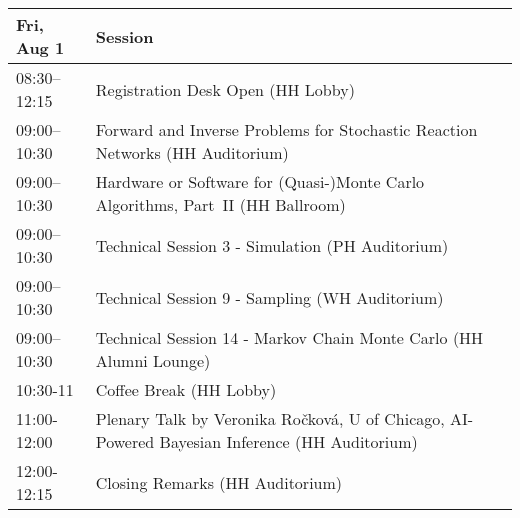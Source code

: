 \begin{table}
{\footnotesize
\begin{tabularx}{\textwidth}{>{\hsize=0.32\hsize}X|>{\hsize=1.7\hsize}X}
\hline
\textbf{Fri, Aug 1} & \textbf{Session} \\
\hline
\cellcolor{\EmptyColor}08:30–12:15 & \cellcolor{\EmptyColor}Registration Desk Open (HH Lobby) \\
\cellcolor{\SessionTitleColor}09:00–10:30 & \cellcolor{\SessionTitleColor}Forward and Inverse Problems for Stochastic Reaction Networks (HH Auditorium) \\
\cellcolor{\SessionTitleColor}09:00–10:30 & \cellcolor{\SessionTitleColor}Hardware or Software for (Quasi-)Monte Carlo Algorithms, Part~II (HH Ballroom) \\
\cellcolor{\SessionLightColor}09:00–10:30 & \cellcolor{\SessionLightColor}Technical Session 3 - Simulation (PH Auditorium) \\
\cellcolor{\SessionLightColor}09:00–10:30 & \cellcolor{\SessionLightColor}Technical Session 9 - Sampling (WH Auditorium) \\
\cellcolor{\SessionLightColor}09:00–10:30 & \cellcolor{\SessionLightColor}Technical Session 14 - Markov Chain Monte Carlo (HH Alumni Lounge) \\
\cellcolor{\EmptyColor}10:30-11 & \cellcolor{\EmptyColor}Coffee Break (HH Lobby) \\
\cellcolor{\PlenaryColor}11:00-12:00 & \cellcolor{\PlenaryColor}Plenary Talk by Veronika Ročková, U of Chicago, AI-Powered Bayesian Inference (HH Auditorium) \\
\cellcolor{\PlenaryColor}12:00-12:15 & \cellcolor{\PlenaryColor}Closing Remarks (HH Auditorium) \\
\hline
\end{tabularx}
}
\end{table}

